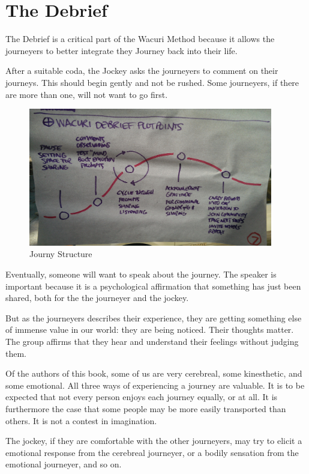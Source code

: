 \documentclass[12pt]{book}
\begin{document}
\chapter{The Debrief}

The Debrief is a critical part of the Wacuri Method
because it allows the journeyers to better integrate
they Journey back into their life.

After a suitable coda, the Jockey asks the journeyers
to comment on their journeys. This should begin gently
and not be rushed. Some journeyers, if there are more than
one, will not want to go first.

\begin{figure}
  \centering
     \includegraphics[width=0.95\textwidth]{WacuriFigures/DebriefStructure.jpg}
     \caption{Journy Structure}
  \label{fig:closeup}     
\end{figure}


Eventually, someone will want to speak about the journey.
The speaker is important because it is a psychological
affirmation that something has just been shared, both
for the the journeyer and the jockey.

But as the journeyers describes their experience, they
are getting something else of immense value in our world:
they are being noticed. Their thoughts matter. The group
affirms that they hear and understand their feelings
without judging them.

Of the authors of this book, some of us are very cerebreal,
some kinesthetic, and some emotional. All three ways of
experiencing a journey are valuable. It is to be expected
that not every person enjoys each journey equally, or at all.
It is furthermore the case that some people may be more easily
transported than others. It is not a contest in imagination.

The jockey, if they are comfortable with the other journeyers,
may try to elicit a emotional response from the cerebreal
journeyer, or a bodily sensation from the emotional journeyer,
and so on.
\end{document}
